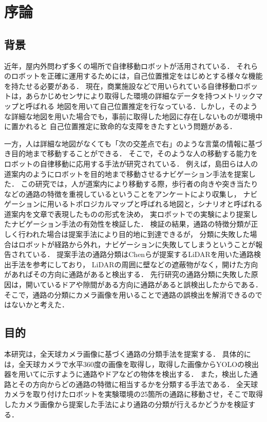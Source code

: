 \documentclass[../main]{subfiles}
\begin{document}
    \setcounter{secnumdepth}{2}
    \chapter{序論}
        \section{背景}
        近年，屋内外問わず多くの場所で自律移動ロボットが活用されている．
        それらのロボットを正確に運用するためには，自己位置推定をはじめとする様々な機能を持たせる必要がある．
        現在，商業施設などで用いられている自律移動ロボットは，あらかじめセンサにより取得した環境の詳細なデータを持つメトリックマップと呼ばれる
        地図を用いて自己位置推定を行なっている．しかし，そのような詳細な地図を用いた場合でも，事前に取得した地図に存在しないものが環境中に置かれると
        自己位置推定に致命的な支障をきたすという問題がある．
        
        
        一方，人は詳細な地図がなくても「次の交差点で右」のような言葉の情報に基づき目的地まで移動することができる．
        そこで，そのような人の移動する能力をロボットの自律移動に応用する手法が研究されている．
        例えば，島田らは人の道案内のようにロボットを目的地まで移動させるナビゲーション手法を提案した\cite{shimada_paper1}\cite{shimada_paper2}．
        この研究では，人が道案内により移動する際，歩行者の向きや突き当たりなどの通路の特徴を重視しているということをアンケートにより収集し，
        ナビゲーションに用いるトポロジカルマップと呼ばれる地図と，シナリオと呼ばれる道案内を文章で表現したものの形式を決め，
        実ロボットでの実験により提案したナビゲーション手法の有効性を検証した．
        検証の結果，通路の特徴分類が正しく行われた場合は提案手法により目的地に到達できるが，
        分類に失敗した場合はロボットが経路から外れ，ナビゲーションに失敗してしまうということが報告されている．
        提案手法の通路分類はChenらが提案するLiDARを用いた通路検出手法\cite{toe_finding_algolithm}を参考にしており，
        LiDARの周囲に壁などの遮蔽物がなく，開けた方向があればその方向に通路があると検出する．
        先行研究の通路分類に失敗した原因は，開いているドアや隙間がある方向に通路があると誤検出したからである．
        そこで，通路の分類にカメラ画像を用いることで通路の誤検出を解消できるのではないかと考えた．

        \newpage

        \section{目的}
        本研究は，全天球カメラ画像に基づく通路の分類手法を提案する．
        具体的には，全天球カメラで水平360度の画像を取得し，取得した画像からYOLOの検出器を用いてに示すように通路やドアなどの物体を検出する．
        また，検出した通路とその方向からどの通路の特徴に相当するかを分類する手法である．
        全天球カメラを取り付けたロボットを実験環境の25箇所の通路に移動させ，そこで取得したカメラ画像から提案した手法により通路の分類が行えるかどうかを検証する．
        
\end{document}
